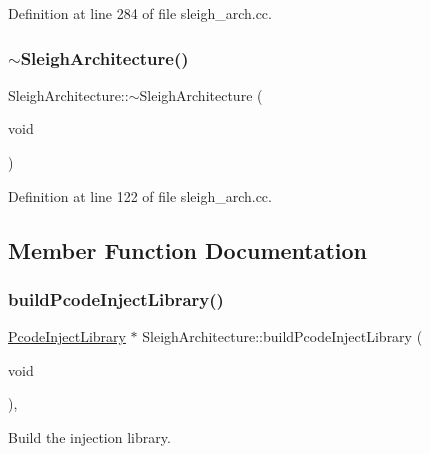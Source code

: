 Definition at line 284 of file sleigh\+\_\+arch.\+cc.

\mbox{\label{class_sleigh_architecture_a6c1b55e945e4614366a38689e02556ed}} 
\subsubsection{\texorpdfstring{$\sim$SleighArchitecture()}{~SleighArchitecture()}}
{\footnotesize\ttfamily Sleigh\+Architecture\+::$\sim$\+Sleigh\+Architecture (\begin{DoxyParamCaption}\item[{void}]{ }\end{DoxyParamCaption})\hspace{0.3cm}{\ttfamily [virtual]}}



Definition at line 122 of file sleigh\+\_\+arch.\+cc.



\subsection{Member Function Documentation}
\mbox{\label{class_sleigh_architecture_ae0b7773ee748ea290358c389e71f2003}} 
\subsubsection{\texorpdfstring{buildPcodeInjectLibrary()}{buildPcodeInjectLibrary()}}
{\footnotesize\ttfamily \mbox{\hyperlink{class_pcode_inject_library}{Pcode\+Inject\+Library}} $\ast$ Sleigh\+Architecture\+::build\+Pcode\+Inject\+Library (\begin{DoxyParamCaption}\item[{void}]{ }\end{DoxyParamCaption})\hspace{0.3cm}{\ttfamily [protected]}, {\ttfamily [virtual]}}



Build the injection library. 

